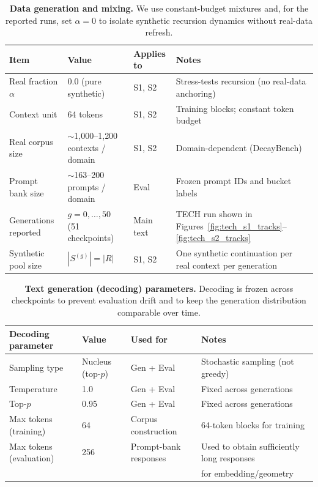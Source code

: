 \documentclass{article}
\theoremstyle{plain}
\theoremstyle{definition}
\theoremstyle{remark}
\begin{document}
\begin{table}[t]
\centering
\footnotesize
\setlength{\tabcolsep}{5pt}
\begin{tabular}{llll}
\toprule
Item & Value & Applies to & Notes \\
\midrule
Real fraction $\alpha$ & $0.0$ (pure synthetic) & S1, S2 & Stress-tests recursion (no real-data anchoring) \\
Context unit & 64 tokens & S1, S2 & Training blocks; constant token budget \\
Real corpus size & $\sim$1{,}000--1{,}200 contexts / domain & S1, S2 & Domain-dependent (DecayBench) \\
Prompt bank size & $\sim$163--200 prompts / domain & Eval & Frozen prompt IDs and bucket labels \\
Generations reported & $g=0,\dots,50$ (51 checkpoints) & Main text & TECH run shown in Figures~\ref{fig:tech_s1_tracks}--\ref{fig:tech_s2_tracks} \\
Synthetic pool size & $|S^{(g)}|=|R|$ & S1, S2 & One synthetic continuation per real context per generation \\
\bottomrule
\end{tabular}
\caption{\textbf{ Data generation and mixing.} We use constant-budget mixtures and, for the reported runs, set $\alpha=0$ to isolate synthetic recursion dynamics without real-data refresh.}
\label{tab:repro_data_mixing}
\end{table}

\begin{table}[t]
\centering
\footnotesize
\setlength{\tabcolsep}{7pt}
\begin{tabular}{llll}
\toprule
Decoding parameter & Value & Used for & Notes \\
\midrule
Sampling type & Nucleus (top-$p$) & Gen + Eval & Stochastic sampling (not greedy) \\
Temperature & 1.0 & Gen + Eval & Fixed across generations \\
Top-$p$ & 0.95 & Gen + Eval & Fixed across generations \\
Max tokens (training) & 64 & Corpus construction & 64-token blocks for training \\
Max tokens (evaluation) & 256 & Prompt-bank responses & Used to obtain sufficiently long responses\\& & & for embedding/geometry \\
\bottomrule
\end{tabular}
\caption{\textbf{ Text generation (decoding) parameters.} Decoding is frozen across checkpoints to prevent evaluation drift and to keep the generation distribution comparable over time.}
\label{tab:repro_decoding}
\end{table}
\end{document}
